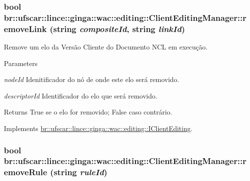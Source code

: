 \hypertarget{classbr_1_1ufscar_1_1lince_1_1ginga_1_1wac_1_1editing_1_1ClientEditingManager_a11e5f1029545aa4c0435094cc59477cb}{
\subsubsection[{removeLink}]{\setlength{\rightskip}{0pt plus 5cm}bool br::ufscar::lince::ginga::wac::editing::ClientEditingManager::removeLink (string {\em compositeId}, \/  string {\em linkId})}}
\label{classbr_1_1ufscar_1_1lince_1_1ginga_1_1wac_1_1editing_1_1ClientEditingManager_a11e5f1029545aa4c0435094cc59477cb}


Remove um elo da Versão Cliente do Documento NCL em execução. 


\begin{DoxyParams}{Parameters}
\item[{\em nodeId}]Idenitificador do nó de onde este elo será removido. \item[{\em descriptorId}]Identificador do elo que será removido. \end{DoxyParams}
\begin{DoxyReturn}{Returns}
True se o elo for removido; False caso contrário. 
\end{DoxyReturn}


Implements \hyperlink{classbr_1_1ufscar_1_1lince_1_1ginga_1_1wac_1_1editing_1_1IClientEditing_a99c3ab683d01ec8fecae2b01f7069bc4}{br::ufscar::lince::ginga::wac::editing::IClientEditing}.

\hypertarget{classbr_1_1ufscar_1_1lince_1_1ginga_1_1wac_1_1editing_1_1ClientEditingManager_a5b363245776a5a71bd3c7628dcf91f7e}{
\subsubsection[{removeRule}]{\setlength{\rightskip}{0pt plus 5cm}bool br::ufscar::lince::ginga::wac::editing::ClientEditingManager::removeRule (string {\em ruleId})}}
\label{classbr_1_1ufscar_1_1lince_1_1ginga_1_1wac_1_1editing_1_1ClientEditingManager_a5b363245776a5a71bd3c7628dcf91f7e}


